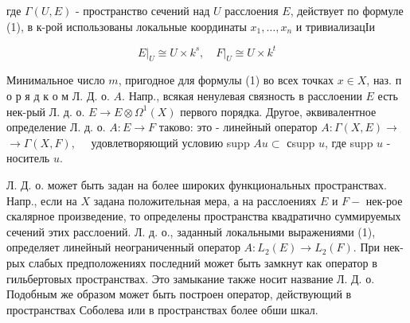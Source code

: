 \documentclass[10pt]{article}
\begin{document}
где $\Gamma(U, E)$ - пространство сечений над $U$ расслоения $E$, действует по формуле (1), в к-рой использованы локальные координаты $x_{1}, \ldots, x_{n}$ и тривиализацІи



\[

\left.E\right|_{U} \cong U \times k^{s},\left.\quad F\right|_{U} \cong U \times k^{t}

\]



Минимальное число $m$, пригодное для формулы (1) во всех точках $x \in X$, наз. п о р я д к о м Л. Д. о. $A$. Напр., всякая ненулевая связность в расслоении $E$ есть нек-рый Л. д. о. $E \rightarrow E \otimes \Omega^{1}(X)$ первого порядка. Другое, әквивалентное определение Л. д. о. $A: E \rightarrow F$ таково: это - линейный оператор $A: \Gamma(X, E) \rightarrow$ $\rightarrow \Gamma(X, F), \quad$ удовлетворяющий условию supp $A u \subset$ сsupp $u$, где supp $u$ - носитель $u$.



Л. Д. о. может быть задан на более широких функциональных пространствах. Напр., если на $X$ задана положительная мера, а на расслоениях $E$ и $F-$ нек-рое скалярное произведение, то определены пространства квадратично суммируемых сечений этих расслоений. Л. д. о., заданный локальными выражениями (1), определяет линейный неограниченный оператор $A: L_{2}(E) \rightarrow L_{2}(F)$. При нек-рых слабых предположениях последний может быть замкнут как оператор в гильбертовых пространствах. Это замыкание также носит название Л. Д. о. Подобным же образом может быть построен оператор, действующий в пространствах Соболева или в пространствах более обши шкал.
\end{document}
